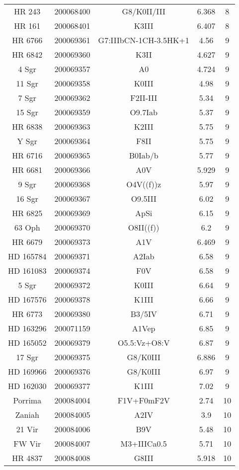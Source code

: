 \begin{table*}
\begin{tabular}{ccccc}
HR 243 & 200068400 & G8/K0II/III & 6.368 & 8 \\
HR 161 & 200068401 & K3III & 6.407 & 8 \\
HR 6766 & 200069361 & G7:IIIbCN-1CH-3.5HK+1 & 4.56 & 9 \\
HR 6842 & 200069360 & K3II & 4.627 & 9 \\
4 Sgr & 200069357 & A0 & 4.724 & 9 \\
11 Sgr & 200069358 & K0III & 4.98 & 9 \\
7 Sgr & 200069362 & F2II-III & 5.34 & 9 \\
15 Sgr & 200069359 & O9.7Iab & 5.37 & 9 \\
HR 6838 & 200069363 & K2III & 5.75 & 9 \\
Y Sgr & 200069364 & F8II & 5.75 & 9 \\
HR 6716 & 200069365 & B0Iab/b & 5.77 & 9 \\
HR 6681 & 200069366 & A0V & 5.929 & 9 \\
9 Sgr & 200069368 & O4V((f))z & 5.97 & 9 \\
16 Sgr & 200069367 & O9.5III & 6.02 & 9 \\
HR 6825 & 200069369 & ApSi & 6.15 & 9 \\
63 Oph & 200069370 & O8II((f)) & 6.2 & 9 \\
HR 6679 & 200069373 & A1V & 6.469 & 9 \\
HD 165784 & 200069371 & A2Iab & 6.58 & 9 \\
HD 161083 & 200069374 & F0V & 6.58 & 9 \\
5 Sgr & 200069372 & K0III & 6.64 & 9 \\
HD 167576 & 200069378 & K1III & 6.66 & 9 \\
HR 6773 & 200069380 & B3/5IV & 6.71 & 9 \\
HD 163296 & 200071159 & A1Vep & 6.85 & 9 \\
HD 165052 & 200069379 & O5.5:Vz+O8:V & 6.87 & 9 \\
17 Sgr & 200069375 & G8/K0III & 6.886 & 9 \\
HD 169966 & 200069376 & G8/K0III & 6.97 & 9 \\
HD 162030 & 200069377 & K1III & 7.02 & 9 \\
Porrima & 200084004 & F1V+F0mF2V & 2.74 & 10 \\
Zaniah & 200084005 & A2IV & 3.9 & 10 \\
21 Vir & 200084006 & B9V & 5.48 & 10 \\
FW Vir & 200084007 & M3+IIICa0.5 & 5.71 & 10 \\
HR 4837 & 200084008 & G8III & 5.918 & 10 \\

\end{tabular}
\end{table*}

